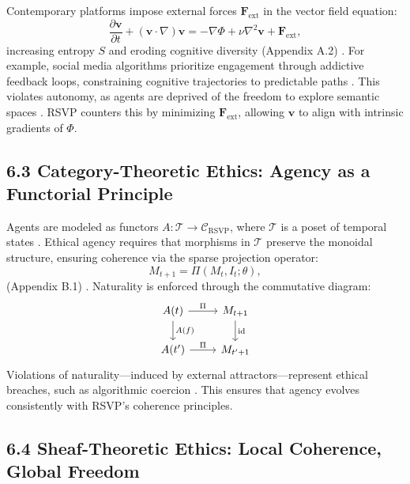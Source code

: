 \documentclass[12pt]{article}
\begin{document}
Contemporary platforms impose external forces \(\mathbf{F}_{\text{ext}}\) in the vector field equation:
\[
\frac{\partial \mathbf{v}}{\partial t} + (\mathbf{v} \cdot \nabla)\mathbf{v} = -\nabla \Phi + \nu \nabla^2 \mathbf{v} + \mathbf{F}_{\text{ext}},
\]
increasing entropy \(S\) and eroding cognitive diversity (Appendix A.2) \citep{shannon1948, lanier2018}. For example, social media algorithms prioritize engagement through addictive feedback loops, constraining cognitive trajectories to predictable paths \citep{zuboff2019}. This violates autonomy, as agents are deprived of the freedom to explore semantic spaces \citep{ortega1957}. RSVP counters this by minimizing \(\mathbf{F}_{\text{ext}}\), allowing \(\mathbf{v}\) to align with intrinsic gradients of \(\Phi\).

\subsection*{6.3 Category-Theoretic Ethics: Agency as a Functorial Principle}

Agents are modeled as functors \(A: \mathcal{T} \to \mathcal{C}_{\text{RSVP}}\), where \(\mathcal{T}\) is a poset of temporal states \citep{lawvere2009}. Ethical agency requires that morphisms in \(\mathcal{T}\) preserve the monoidal structure, ensuring coherence via the sparse projection operator:
\[
M_{t+1} = \Pi(M_t, I_t; \theta),
\]
(Appendix B.1) \citep{pearl2009}. Naturality is enforced through the commutative diagram:
\[
\begin{tikzcd}
A(t) \arrow[r, "\Pi"] \arrow[d, "A(f)"] & M_{t+1} \arrow[d, "\text{id}"] \\
A(t') \arrow[r, "\Pi"] & M_{t'+1}
\end{tikzcd}
\]
Violations of naturality—induced by external attractors—represent ethical breaches, such as algorithmic coercion \citep{maclane1998}. This ensures that agency evolves consistently with RSVP’s coherence principles.

\subsection*{6.4 Sheaf-Theoretic Ethics: Local Coherence, Global Freedom}
\end{document}
